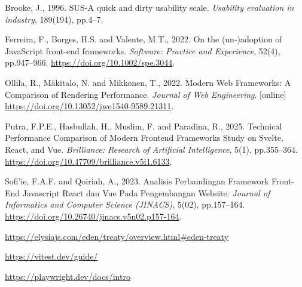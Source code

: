 \documentclass[12pt,a4paper]{report}
\begin{document}
\vspace{0.6em}
\noindent Brooke, J., 1996. SUS-A quick and dirty usability scale. \textit{Usability evaluation in industry}, 189(194), pp.4--7.

\vspace{0.6em}
\noindent Ferreira, F., Borges, H.S. and Valente, M.T., 2022. On the (un-)adoption of JavaScript front-end frameworks. \textit{Software: Practice and Experience}, 52(4), pp.947--966. \url{https://doi.org/10.1002/spe.3044}.

\vspace{0.6em}
\noindent Ollila, R., M\"akitalo, N. and Mikkonen, T., 2022. Modern Web Frameworks: A Comparison of Rendering Performance. \textit{Journal of Web Engineering}. [online] \url{https://doi.org/10.13052/jwe1540-9589.21311}.

\vspace{0.6em}
\noindent Putra, F.P.E., Hasbullah, H., Muslim, F. and Paradina, R., 2025. Technical Performance Comparison of Modern Frontend Frameworks Study on Svelte, React, and Vue. \textit{Brilliance: Research of Artificial Intelligence}, 5(1), pp.355--364. \url{https://doi.org/10.47709/brilliance.v5i1.6133}.

\vspace{0.6em}
\noindent Sofi'ie, F.A.F. and Qoiriah, A., 2023. Analisis Perbandingan Framework Front-End Javascript React dan Vue Pada Pengembangan Website. \textit{Journal of Informatics and Computer Science (JINACS)}, 5(02), pp.157--164. \url{https://doi.org/10.26740/jinacs.v5n02.p157-164}.

\vspace{0.6em}
\noindent \url{https://elysiajs.com/eden/treaty/overview.html#eden-treaty}

\vspace{0.6em}
\noindent \url{https://vitest.dev/guide/}

\vspace{0.6em}
\noindent \url{https://playwright.dev/docs/intro}
\end{document}
